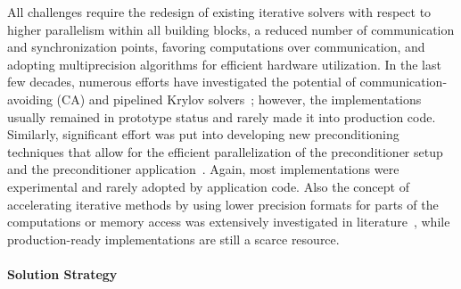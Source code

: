 All challenges require the redesign of existing iterative solvers with respect 
to higher parallelism within all building blocks, a reduced number of 
communication and synchronization points, favoring computations over 
communication, and adopting multiprecision algorithms for efficient hardware 
utilization. 
In the last few decades, numerous efforts 
have investigated the potential of communication-avoiding (CA) and pipelined 
Krylov solvers~\cite{yamazakiipdps2014,Cornelis2018TheCC}; however, the 
implementations usually 
remained in prototype status and rarely made it into production code. 
Similarly, significant effort was put into developing new preconditioning 
techniques that allow for the efficient parallelization of the preconditioner 
setup and the preconditioner 
application~\cite{chowisc2015,anzteuropa2015,ANZT20181}. 
Again, most implementations were experimental and rarely adopted by application 
code.
Also the concept of accelerating iterative methods by using lower precision 
formats for parts of the computations or memory access was extensively 
investigated in literature~\cite{carson1,carson2,doi:10.1002/cpe.4460}, 
while production-ready implementations are still a scarce resource. 


\paragraph{Solution Strategy}

